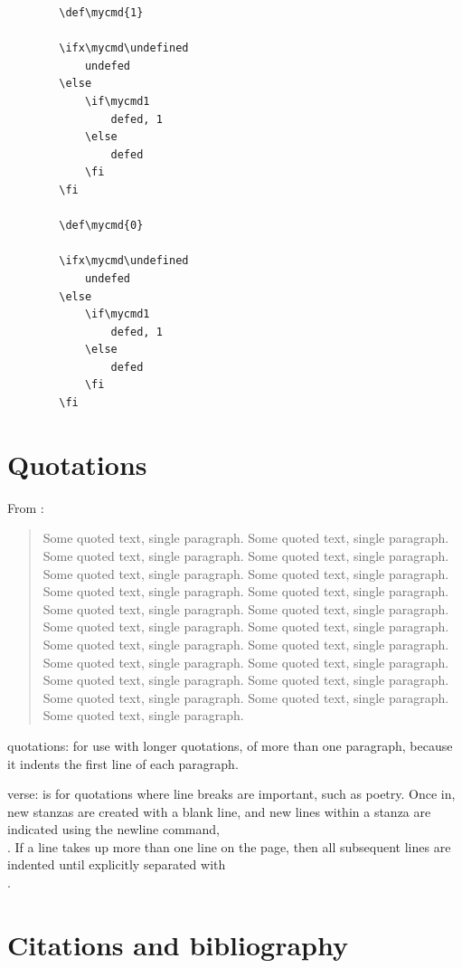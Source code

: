 \documentclass[12pt]{article}
\begin{document}
    \begin{lstlisting}
        \def\mycmd{1}

        \ifx\mycmd\undefined
            undefed
        \else
            \if\mycmd1
                defed, 1
            \else
                defed
            \fi
        \fi

        \def\mycmd{0}

        \ifx\mycmd\undefined
            undefed
        \else
            \if\mycmd1
                defed, 1
            \else
                defed
            \fi
        \fi
    \end{lstlisting}

\section{Quotations}\label{quotations}

    From \cite{Aa00}:

    \begin{quote}
        Some quoted text, single paragraph. Some quoted text, single paragraph. Some quoted text, single paragraph.
        Some quoted text, single paragraph. Some quoted text, single paragraph. Some quoted text, single paragraph.
        Some quoted text, single paragraph. Some quoted text, single paragraph. Some quoted text, single paragraph.
        Some quoted text, single paragraph. Some quoted text, single paragraph. Some quoted text, single paragraph.
        Some quoted text, single paragraph. Some quoted text, single paragraph. Some quoted text, single paragraph.
        Some quoted text, single paragraph. Some quoted text, single paragraph. Some quoted text, single paragraph.
        Some quoted text, single paragraph. Some quoted text, single paragraph. Some quoted text, single paragraph.
    \end{quote}

    quotations:
        for use with longer quotations, of more than one paragraph, because it indents the first line of each paragraph.

    verse:
        is for quotations where line breaks are important, such as poetry. Once in, new stanzas are created with a blank line, and new lines within a stanza are indicated using the newline command, \\. If a line takes up more than one line on the page, then all subsequent lines are indented until explicitly separated with \\.

\section{Citations and bibliography}\label{secCit}
\end{document}
